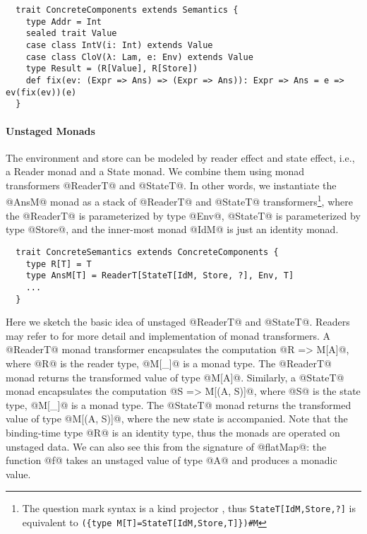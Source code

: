 \begin{lstlisting}
  trait ConcreteComponents extends Semantics {
    type Addr = Int
    sealed trait Value
    case class IntV(i: Int) extends Value
    case class CloV(λ: Lam, e: Env) extends Value
    type Result = (R[Value], R[Store])
    def fix(ev: (Expr => Ans) => (Expr => Ans)): Expr => Ans = e => ev(fix(ev))(e)
  }
\end{lstlisting}

\paragraph{Unstaged Monads}
The environment and store can be modeled by reader effect and state effect,
i.e., a Reader monad and a State monad. We combine them using monad transformers
@ReaderT@ and @StateT@.
In other words, we instantiate the @AnsM@ monad as a stack of @ReaderT@ and @StateT@
transformers\footnote{The question mark syntax is a kind projector
  \cite{kindprojector}, thus \texttt{StateT[IdM,Store,?]} is equivalent to \newline
  \texttt{(\{type M[T]=StateT[IdM,Store,T]\})\#M}}, where the @ReaderT@ is
parameterized by type @Env@, @StateT@ is parameterized by type @Store@, and the
inner-most monad @IdM@ is just an identity monad.

\begin{lstlisting}
  trait ConcreteSemantics extends ConcreteComponents {
    type R[T] = T
    type AnsM[T] = ReaderT[StateT[IdM, Store, ?], Env, T]
    ...
  }
\end{lstlisting}

Here we sketch the basic idea of unstaged @ReaderT@ and @StateT@. Readers may
refer to \cite{DBLP:conf/popl/LiangHJ95, Chiusano:2014:FPS:2688794} for more detail 
and implementation of monad transformers.
A @ReaderT@ monad transformer encapsulates the computation @R => M[A]@, where
@R@ is the reader type, @M[_]@ is a monad type. The @ReaderT@ monad returns the
transformed value of type @M[A]@. Similarly, a @StateT@ monad encapsulates the
computation @S => M[(A, S)]@, where @S@ is the state type, @M[_]@ is a monad
type. The @StateT@ monad returns the transformed value of type @M[(A, S)]@,
where the new state is accompanied.
Note that the binding-time type @R@ is an identity type, thus the monads are
operated on unstaged data. We can also see this from the signature of @flatMap@:
the function @f@ takes an unstaged value of type @A@ and produces a monadic
value.

